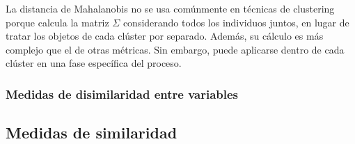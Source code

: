 La distancia de Mahalanobis no se usa comúnmente en técnicas de clustering porque calcula la matriz $\Sigma$ considerando todos los individuos juntos, en lugar 
de tratar los objetos de cada clúster por separado. Además, su cálculo es más complejo que el de otras métricas. Sin embargo, puede aplicarse dentro de 
cada clúster en una fase específica del proceso\cite{cluster-mahalanobis}.





\subsubsection{Medidas de disimilaridad entre variables}


\subsection{Medidas de similaridad}



